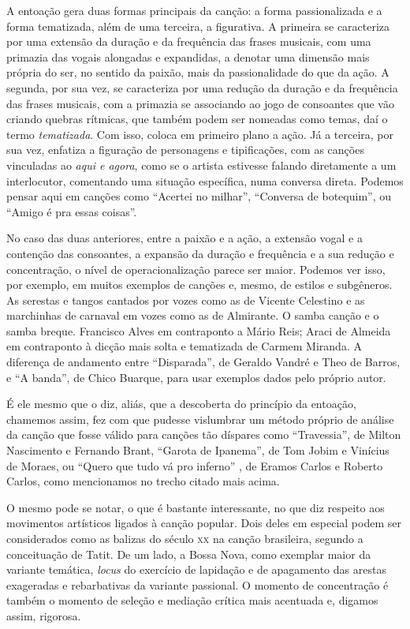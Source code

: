 A entoação gera duas formas principais da canção: a forma passionalizada
e a forma tematizada, além de uma terceira, a figurativa. A primeira se
caracteriza por uma extensão da duração e da frequência das frases
musicais, com uma primazia das vogais alongadas e expandidas, a denotar
uma dimensão mais própria do ser, no sentido da paixão, mais da
passionalidade do que da ação. A segunda, por sua vez, se caracteriza
por uma redução da duração e da frequência das frases musicais, com a
primazia se associando ao jogo de consoantes que vão criando quebras
rítmicas, que também podem ser nomeadas como temas, daí o termo
\textit{tematizada}. Com isso, coloca em primeiro plano a ação. Já a terceira,
por sua vez, enfatiza a figuração de personagens e tipificações, com as
canções vinculadas ao \textit{aqui e agora}, como se o artista estivesse
falando diretamente a um interlocutor, comentando uma situação
específica, numa conversa direta. Podemos pensar aqui em canções como
``Acertei no milhar'', ``Conversa de botequim'', ou ``Amigo é pra essas
coisas''.

No caso das duas anteriores, entre a paixão e a ação, a extensão vogal e
a contenção das consoantes, a expansão da duração e frequência e a sua
redução e concentração, o nível de operacionalização parece ser maior.
Podemos ver isso, por exemplo, em muitos exemplos de canções e, mesmo,
de estilos e subgêneros. As serestas e tangos cantados por vozes como as
de Vicente Celestino e as marchinhas de carnaval em vozes como as de
Almirante. O samba canção e o samba breque. Francisco Alves em
contraponto a Mário Reis; Araci de Almeida em contraponto à dicção mais
solta e tematizada de Carmem Miranda. A diferença de andamento entre
``Disparada'', de Geraldo Vandré e Theo de Barros, e ``A banda'', de Chico Buarque,
para usar exemplos dados pelo próprio autor.

É ele mesmo que o diz, aliás, que a descoberta do princípio da entoação,
chamemos assim, fez com que pudesse vislumbrar um método próprio de
análise da canção que fosse válido para canções tão díspares como
``Travessia'', de Milton Nascimento e Fernando Brant, ``Garota de Ipanema'', de Tom Jobim e Vinícius de Moraes, ou ``Quero que tudo vá pro inferno''
, de Eramos Carlos e Roberto Carlos, como mencionamos no trecho citado mais
acima.

O mesmo pode se notar, o que é bastante interessante, no que diz
respeito aos movimentos artísticos ligados à canção popular. Dois deles
em especial podem ser considerados como as balizas do século \textsc{xx} na
canção brasileira, segundo a conceituação de Tatit. De um lado, a Bossa
Nova, como exemplar maior da variante temática, \textit{locus} do
exercício de lapidação e de apagamento das arestas exageradas e
rebarbativas da variante passional. O momento de concentração é também o
momento de seleção e mediação crítica mais acentuada e, digamos assim,
rigorosa.

